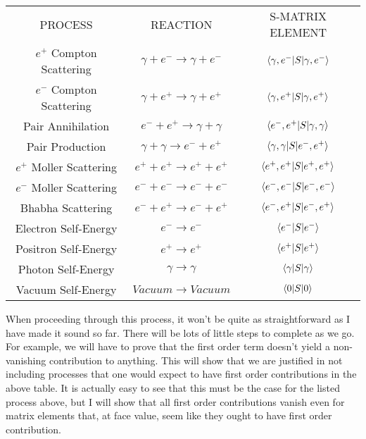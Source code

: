 \documentclass[a4]{article}
\begin{document}
        \begin{center}
        \begin{tabular}{|c c c|}
            \hline
            PROCESS & REACTION & S-MATRIX ELEMENT \\
            $e^{+}$ Compton Scattering & $\gamma + e^{-} \rightarrow \gamma + e^{-}$ & $\braket{\gamma , e^{-}|S|\gamma , e^{-}}$ \\
            $e^{-}$ Compton Scattering & $\gamma + e^{+} \rightarrow \gamma + e^{+}$ & $\braket{\gamma , e^{+}|S|\gamma , e^{+}}$ \\
            Pair Annihilation & $e^{-} + e^{+} \rightarrow \gamma + \gamma$ & $\braket{e^{-} , e^{+}|S|\gamma , \gamma}$ \\
            Pair Production & $\gamma + \gamma \rightarrow e^{-} + e^{+}$ & $\braket{\gamma , \gamma|S|e^{-} , e^{+}}$ \\
            $e^{+}$ Moller Scattering & $e^{+} + e^{+} \rightarrow e^{+} + e^{+}$ & $\braket{e^{+} , e^{+}|S|e^{+} , e^{+}}$ \\
            $e^{-}$ Moller Scattering & $e^{-} + e^{-} \rightarrow e^{-} + e^{-}$ & $\braket{e^{-} , e^{-}|S|e^{-} , e^{-}}$ \\
            Bhabha Scattering & $e^{-} + e^{+} \rightarrow e^{-} + e^{+}$ & $\braket{e^{-} , e^{+}|S|e^{-} , e^{+}}$ \\
            Electron Self-Energy & $e^{-} \rightarrow e^{-}$ & $\braket{e^{-}|S|e^{-}}$ \\
            Positron Self-Energy & $e^{+} \rightarrow e^{+}$ & $\braket{e^{+}|S|e^{+}}$ \\
            Photon Self-Energy & $\gamma \rightarrow \gamma$ & $\braket{\gamma|S|\gamma}$ \\
            Vacuum Self-Energy & $Vacuum \rightarrow Vacuum$ & $\braket{0|S|0}$ \\
            \hline
        \end{tabular}
        \end{center}

        \vspace{0.75cm}

        When proceeding through this process, it won't be quite as straightforward as I have made it sound so far.
        There will be lots of little steps to complete as we go. For example, we will have to prove that the first
        order term doesn't yield a non-vanishing contribution to anything. This will show that we are justified in
        not including processes that one would expect to have first order contributions in the above table. It is
        actually easy to see that this must be the case for the listed process above, but I will show that all first
        order contributions vanish even for matrix elements that, at face value, seem like they ought to have first
        order contribution.
\end{document}
